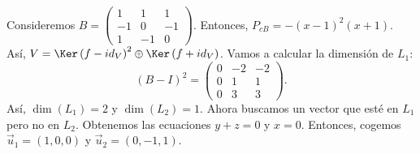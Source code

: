 \begin{eg}
	\normalfont Consideremos $\displaystyle B = \begin{pmatrix} 1 & 1 & 1 \\ - 1 & 0 & - 1 \\ 1 & - 1 & 0 \end{pmatrix} $. Entonces, $\displaystyle P_{cB} = -\left(x-1\right)^{2}\left(x+1\right) $. Así, $\displaystyle V = \Ker\left(f - id _{V}\right)^{2} \oplus \Ker\left(f + id _{V}\right) $. Vamos a calcular la dimensión de $\displaystyle L_{1} $:
	\[\left(B - I\right)^{2} = \begin{pmatrix} 0 & - 2 & - 2 \\ 0 & 1 & 1 \\ 0 & 3 & 3 \end{pmatrix} .\]
Así, $\displaystyle \dim\left(L_{1}\right) = 2 $ y $\displaystyle \dim\left(L_{2}\right) = 1 $. Ahora buscamos un vector que esté en $\displaystyle L_{1} $ pero no en $\displaystyle L_{2} $. Obtenemos las ecuaciones $\displaystyle y + z = 0 $ y $\displaystyle x = 0 $. Entonces, cogemos $\displaystyle \vec{u}_{1} = \left(1, 0, 0\right) $ y $\displaystyle \vec{u}_{2} = \left(0, -1, 1\right) $.  
\end{eg}
